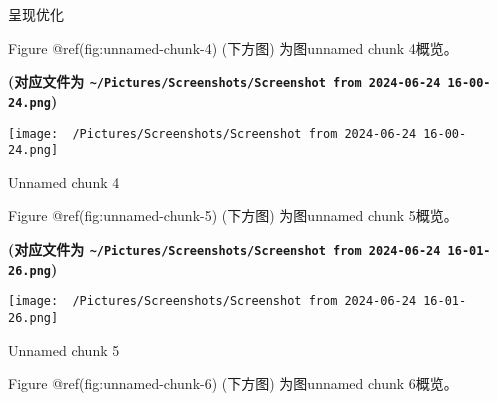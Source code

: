 \documentclass[
  ignorenonframetext,
]{beamer}
\begin{document}
\begin{frame}[fragile]{呈现优化}
\protect\hypertarget{ux5448ux73b0ux4f18ux5316}{}
\begin{center}\vspace{1.5cm}\end{center}

Figure @ref(fig:unnamed-chunk-4) (下方图) 为图unnamed chunk 4概览。

\textbf{(对应文件为
\texttt{\textasciitilde{}/Pictures/Screenshots/Screenshot\ from\ 2024-06-24\ 16-00-24.png})}

\def\@captype{figure}
\begin{center}
\texttt{[image: ~/Pictures/Screenshots/Screenshot from 2024-06-24 16-00-24.png]}
\caption{Unnamed chunk 4}\label{fig:unnamed-chunk-4}
\end{center}

\begin{center}\vspace{1.5cm}\end{center}

\begin{center}\vspace{1.5cm}\end{center}

Figure @ref(fig:unnamed-chunk-5) (下方图) 为图unnamed chunk 5概览。

\textbf{(对应文件为
\texttt{\textasciitilde{}/Pictures/Screenshots/Screenshot\ from\ 2024-06-24\ 16-01-26.png})}

\def\@captype{figure}
\begin{center}
\texttt{[image: ~/Pictures/Screenshots/Screenshot from 2024-06-24 16-01-26.png]}
\caption{Unnamed chunk 5}\label{fig:unnamed-chunk-5}
\end{center}

\begin{center}\vspace{1.5cm}\end{center}

\begin{center}\vspace{1.5cm}\end{center}

Figure @ref(fig:unnamed-chunk-6) (下方图) 为图unnamed chunk 6概览。


\end{frame}
\end{document}
